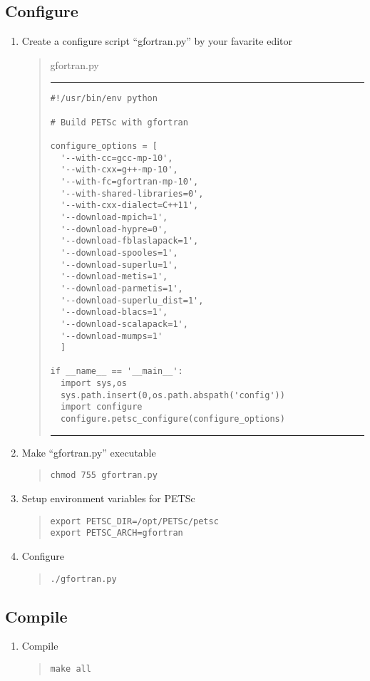 \documentclass[11pt]{article}
\begin{document}
\subsection{Configure}
\begin{enumerate}
\item
Create a configure script ``gfortran.py'' by your favarite editor
\begin{quote}
gfortran.py
\hrule
\begin{verbatim}
#!/usr/bin/env python

# Build PETSc with gfortran

configure_options = [
  '--with-cc=gcc-mp-10',
  '--with-cxx=g++-mp-10',
  '--with-fc=gfortran-mp-10',
  '--with-shared-libraries=0',
  '--with-cxx-dialect=C++11',
  '--download-mpich=1',
  '--download-hypre=0',
  '--download-fblaslapack=1',
  '--download-spooles=1',
  '--download-superlu=1',
  '--download-metis=1',
  '--download-parmetis=1',
  '--download-superlu_dist=1',
  '--download-blacs=1',
  '--download-scalapack=1',
  '--download-mumps=1'
  ]

if __name__ == '__main__':
  import sys,os
  sys.path.insert(0,os.path.abspath('config'))
  import configure
  configure.petsc_configure(configure_options)
\end{verbatim}
\hrule
\end{quote}
\item
Make ``gfortran.py'' executable
\begin{quote}
\begin{verbatim}
chmod 755 gfortran.py
\end{verbatim}
\end{quote}
\item
Setup environment variables for PETSc
\begin{quote}
\begin{verbatim}
export PETSC_DIR=/opt/PETSc/petsc
export PETSC_ARCH=gfortran
\end{verbatim}
\end{quote}
\item
Configure
\begin{quote}
\begin{verbatim}
./gfortran.py
\end{verbatim}
\end{quote}

\end{enumerate}

\subsection{Compile}
\begin{enumerate}
\item
Compile
\begin{quote}
\begin{verbatim}
make all
\end{verbatim}
\end{quote}
\end{enumerate}
\end{document}
